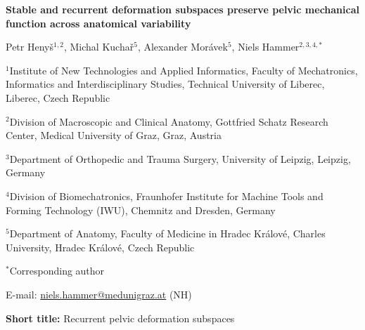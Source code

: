 \documentclass[11pt]{article}
\newcommand{\ManuscriptTitle}{Stable and recurrent deformation subspaces preserve pelvic mechanical function across anatomical variability}
\newcommand{\ShortTitle}{Recurrent pelvic deformation subspaces}
\begin{document}
\begin{flushleft}
{\LARGE\bfseries \ManuscriptTitle\par}
\vspace{1.5em}
{\normalsize Petr Heny\v{s}$^{1,2}$, Michal Kucha\v{r}$^{5}$, Alexander Mor\'{a}vek$^{5}$, Niels Hammer$^{2,3,4,*}$\par}
\vspace{0.75em}
{\small $^{1}$Institute of New Technologies and Applied Informatics, Faculty of Mechatronics, Informatics and Interdisciplinary Studies, Technical University of Liberec, Liberec, Czech Republic\par}
{\small $^{2}$Division of Macroscopic and Clinical Anatomy, Gottfried Schatz Research Center, Medical University of Graz, Graz, Austria\par}
{\small $^{3}$Department of Orthopedic and Trauma Surgery, University of Leipzig, Leipzig, Germany\par}
{\small $^{4}$Division of Biomechatronics, Fraunhofer Institute for Machine Tools and Forming Technology (IWU), Chemnitz and Dresden, Germany\par}
{\small $^{5}$Department of Anatomy, Faculty of Medicine in Hradec Kr\'{a}lov\'{e}, Charles University, Hradec Kr\'{a}lov\'{e}, Czech Republic\par}
\vspace{0.75em}
{\small $^{*}$Corresponding author\par}
{\small E-mail: \href{mailto:niels.hammer@medunigraz.at}{niels.hammer@medunigraz.at} (NH)\par}
\vspace{0.75em}
{\small \textbf{Short title:} \ShortTitle\par}
\end{flushleft}

\clearpage


\end{document}
